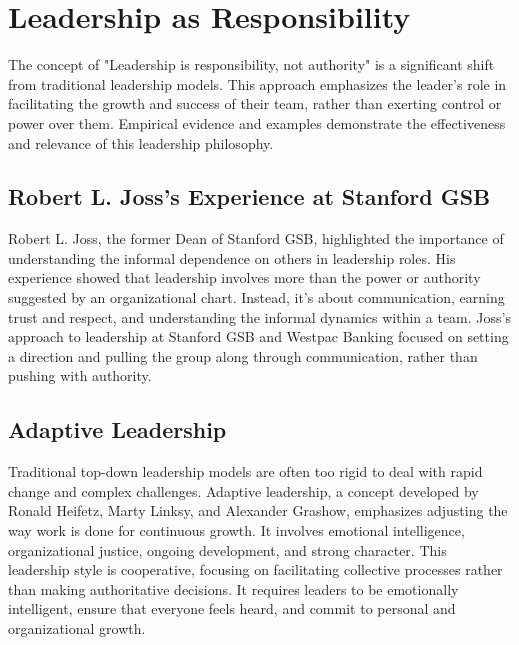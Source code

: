 \documentclass[runningheads]{llncs}
\begin{document}
\section{Leadership as Responsibility}

The concept of "Leadership is responsibility, not authority" is a significant shift from traditional leadership models. This approach emphasizes the leader's role in facilitating the growth and success of their team, rather than exerting control or power over them. Empirical evidence and examples demonstrate the effectiveness and relevance of this leadership philosophy.

\subsection{Robert L. Joss's Experience at Stanford GSB}

Robert L. Joss, the former Dean of Stanford GSB, highlighted the importance of understanding the informal dependence on others in leadership roles. His experience showed that leadership involves more than the power or authority suggested by an organizational chart. Instead, it's about communication, earning trust and respect, and understanding the informal dynamics within a team. Joss's approach to leadership at Stanford GSB and Westpac Banking focused on setting a direction and pulling the group along through communication, rather than pushing with authority.

\subsection{Adaptive Leadership}

Traditional top-down leadership models are often too rigid to deal with rapid change and complex challenges. Adaptive leadership, a concept developed by Ronald Heifetz, Marty Linksy, and Alexander Grashow, emphasizes adjusting the way work is done for continuous growth. It involves emotional intelligence, organizational justice, ongoing development, and strong character. This leadership style is cooperative, focusing on facilitating collective processes rather than making authoritative decisions. It requires leaders to be emotionally intelligent, ensure that everyone feels heard, and commit to personal and organizational growth.
\end{document}
